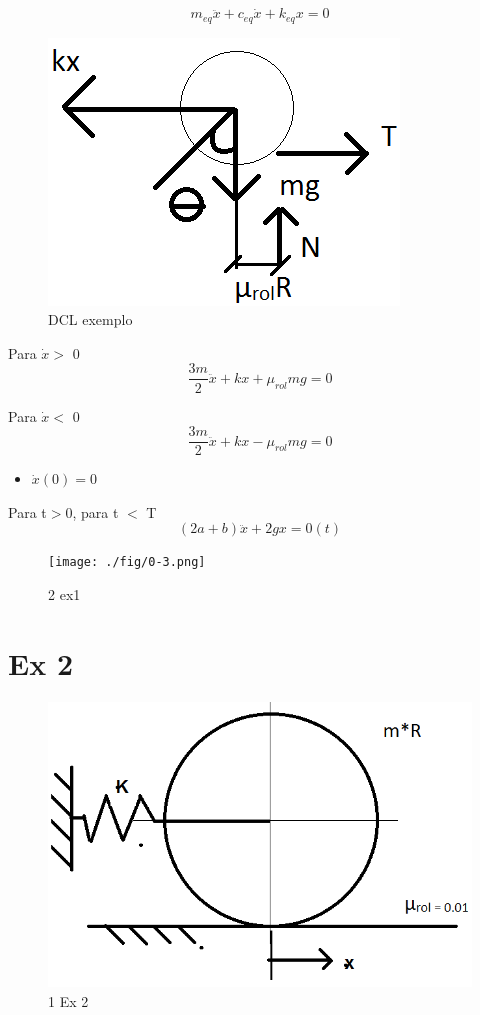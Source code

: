 \documentclass[a4paper, 12pt]{article}
\begin{document}
\[m_{eq}\ddot{x}+c_{eq}\dot{x} +k_{eq}x=0\]

\begin{figure}[h]
\begin{center}
\includegraphics[scale=0.78]{./fig/0-2.png}
\caption{\label{fig:02} DCL exemplo} 
\end{center}
\end{figure}


Para $\dot{x}>$  0
\[\frac{3m}{2}\ddot{x}+kx+\mu _{rol}mg=0\]

Para $\dot{x}<$  0
\[\frac{3m}{2}\ddot{x}+kx-\mu _{rol}mg=0\]
\begin{itemize}
\item $\dot{x}(0)=0$
\end{itemize}
Para t$>$0, para t $<$ T
\[(2a+b)\ddot{x}+2gx=0(t)\]
\begin{figure}[h]
\begin{center}
\texttt{[image: ./fig/0-3.png]}
\caption{\label{fig:1}2 ex1} 
\end{center}
\end{figure}

\section{Ex 2}

\begin{figure}[h]
\begin{center}
\includegraphics[scale=0.48]{./fig/1.png}
\caption{\label{fig:1}1 Ex 2} 
\end{center}
\end{figure}
\end{document}
